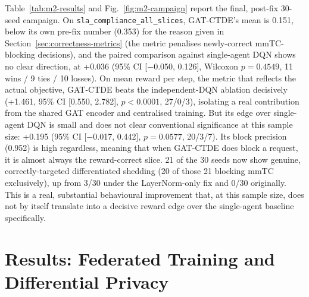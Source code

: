 \documentclass[journal]{IEEEtran}
\begin{document}
Table~\ref{tab:m2-results} and Fig.~\ref{fig:m2-campaign} report the
final, post-fix 30-seed campaign. On \texttt{sla\_compliance\_all\_slices},
GAT-CTDE's mean is 0.151, below its own pre-fix number (0.353) for the
reason given in Section~\ref{sec:correctness-metrics} (the metric
penalises newly-correct mmTC-blocking decisions), and the paired
comparison against single-agent DQN shows no clear direction, at
+0.036 (95\% CI [$-$0.050, 0.126], Wilcoxon $p=0.4549$, 11 wins / 9 ties / 10
losses). On mean reward per step, the metric that reflects the actual
objective, GAT-CTDE beats the independent-DQN ablation decisively
(+1.461, 95\% CI [0.550, 2.782], $p<0.0001$, 27/0/3), isolating a real
contribution from the shared GAT encoder and centralised training.
But its edge over single-agent DQN is small and does not clear
conventional significance at this sample size: +0.195 (95\% CI
[$-$0.017, 0.442], $p=0.0577$, 20/3/7). Its block precision (0.952) is
high regardless, meaning that when GAT-CTDE does block a request, it
is almost always the reward-correct slice. 21 of the 30 seeds now show
genuine, correctly-targeted differentiated shedding (20 of those 21
blocking mmTC exclusively), up from 3/30 under the LayerNorm-only fix
and 0/30 originally. This is a real, substantial behavioural improvement that,
at this sample size, does not by itself translate into a decisive
reward edge over the single-agent baseline specifically.

\begin{table}[t]
\caption{M2 campaign results, 30 seeds/arm, 95\% bootstrap CIs.}
\label{tab:m2-results}
\centering
{}
\end{table}

\section{Results: Federated Training and Differential Privacy}
\label{sec:results-m3}
\end{document}
